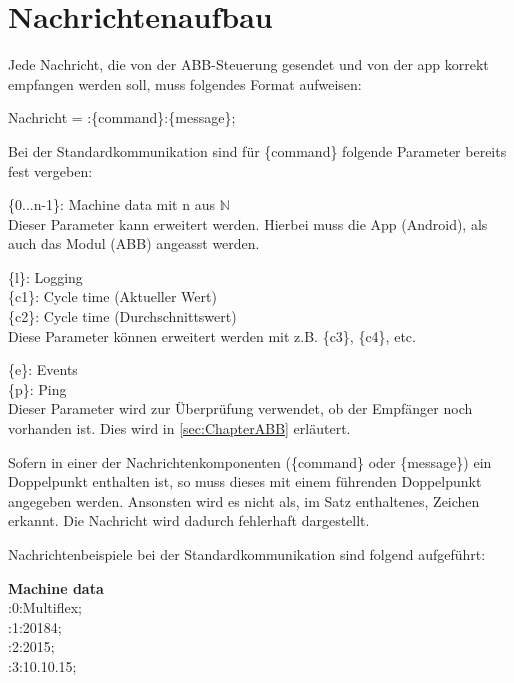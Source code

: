 \section{Nachrichtenaufbau}
\label{sec:Nachrichtenaufbau}
Jede Nachricht, die von der ABB-Steuerung gesendet und von der \gls{app} 
korrekt 
empfangen werden soll, muss folgendes Format aufweisen:

Nachricht = :\{command\}:\{message\};

Bei der Standardkommunikation sind für \{command\} folgende Parameter bereits 
fest vergeben:

\{0...n-1\}: Machine data mit n aus $\mathbb{N}$ \\
Dieser Parameter kann erweitert werden. Hierbei muss die App (Android), als 
auch das Modul (ABB) angeasst werden.

\{l\}: Logging \\

\{c1\}: Cycle time (Aktueller Wert)\\
\{c2\}: Cycle time (Durchschnittswert)\\
Diese Parameter können erweitert werden mit z.B. \{c3\}, \{c4\}, etc.

\{e\}: Events\\

\{p\}: Ping\\
Dieser Parameter wird zur Überprüfung verwendet, ob der Empfänger noch 
vorhanden ist. Dies wird in \ref{sec:ChapterABB} erläutert.

Sofern in einer der Nachrichtenkomponenten (\{command\} oder \{message\}) ein 
Doppelpunkt enthalten ist, so muss dieses mit einem führenden Doppelpunkt 
angegeben werden. Ansonsten wird es nicht als, im Satz enthaltenes, Zeichen 
erkannt. Die Nachricht wird dadurch fehlerhaft dargestellt.

Nachrichtenbeispiele bei der Standardkommunikation sind folgend aufgeführt:

\textbf{Machine data}\\
:0:Multiflex; \\
:1:20184; \\
:2:2015; \\
:3:10.10.15; \\

